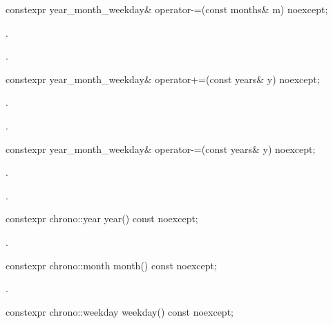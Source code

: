 %
\begin{itemdecl}
constexpr year_month_weekday& operator-=(const months& m) noexcept;
\end{itemdecl}

\begin{itemdescr}
\pnum
\effects {}.

\pnum
\returns {}.
\end{itemdescr}

%
\begin{itemdecl}
constexpr year_month_weekday& operator+=(const years& y) noexcept;
\end{itemdecl}

\begin{itemdescr}
\pnum
\effects {}.

\pnum
\returns {}.
\end{itemdescr}

%
\begin{itemdecl}
constexpr year_month_weekday& operator-=(const years& y) noexcept;
\end{itemdecl}

\begin{itemdescr}
\pnum
\effects {}.

\pnum
\returns {}.
\end{itemdescr}

%
\begin{itemdecl}
constexpr chrono::year year() const noexcept;
\end{itemdecl}

\begin{itemdescr}
\pnum
\returns {}.
\end{itemdescr}

%
\begin{itemdecl}
constexpr chrono::month month() const noexcept;
\end{itemdecl}

\begin{itemdescr}
\pnum
\returns {}.
\end{itemdescr}

%
\begin{itemdecl}
constexpr chrono::weekday weekday() const noexcept;
\end{itemdecl}

